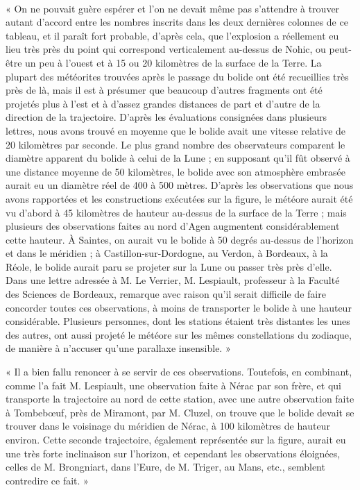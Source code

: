 \documentclass[a4paper, 11pt, oneside, polutonikogreek, french]{article}
\begin{document}
\paragraph{}
« On ne pouvait guère espérer et l'on ne devait même pas s'attendre à trouver autant d'accord entre les nombres inscrits dans les deux dernières colonnes de ce tableau, et il paraît fort probable, d'après cela, que l'explosion a réellement eu lieu très près du point qui correspond verticalement au-dessus de Nohic, ou peut-être un peu à l'ouest et à 15 ou 20 kilomètres de la surface de la Terre. La plupart des météorites trouvées après le passage du bolide ont été recueillies très près de là, mais il est à présumer que beaucoup d'autres fragments ont été projetés plus à l'est et à d'assez grandes distances de part et d'autre de la direction de la trajectoire. D'après les évaluations consignées dans plusieurs lettres, nous avons trouvé en moyenne que le bolide avait une vitesse relative de 20 kilomètres par seconde. Le plus grand nombre des observateurs comparent le diamètre apparent du bolide à celui de la Lune ; en supposant qu'il fût observé à une distance moyenne de 50 kilomètres, le bolide avec son atmosphère embrasée aurait eu un diamètre réel de 400 à 500 mètres. D'après les observations que nous avons rapportées et les constructions exécutées sur la figure, le météore aurait été vu d'abord à 45 kilomètres de hauteur au-dessus de la surface de la Terre ; mais plusieurs des observations faites au nord d'Agen augmentent considérablement cette hauteur. À Saintes, on aurait vu le bolide à 50 degrés au-dessus de l'horizon et dans le méridien ; à Castillon-sur-Dordogne, au Verdon, à Bordeaux, à la Réole, le bolide aurait paru se projeter sur la Lune ou passer très près d'elle. Dans une lettre adressée à M. Le Verrier, M. Lespiault, professeur à la Faculté des Sciences de Bordeaux, remarque avec raison qu'il serait difficile de faire concorder toutes ces observations, à moins de transporter le bolide à une hauteur considérable. Plusieurs personnes, dont les stations étaient très distantes les unes des autres, ont aussi projeté le météore sur les mêmes constellations du zodiaque, de manière à n'accuser qu'une parallaxe insensible. »

« Il a bien fallu renoncer à se servir de ces observations. Toutefois, en combinant, comme l'a fait M. Lespiault, une observation faite à Nérac par son frère, et qui transporte la trajectoire au nord de cette station, avec une autre observation faite à Tombebœuf, près de Miramont, par M. Cluzel, on trouve que le bolide devait se trouver dans le voisinage du méridien de Nérac, à 100 kilomètres de hauteur environ. Cette seconde trajectoire, également représentée sur la figure, aurait eu une très forte inclinaison sur l'horizon, et cependant les observations éloignées, celles de M. Brongniart, dans l'Eure, de M. Triger, au Mans, etc., semblent contredire ce fait. »
\end{document}
